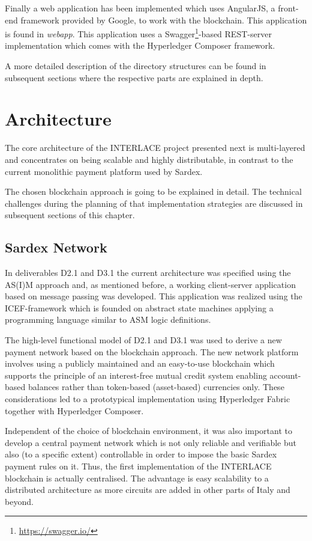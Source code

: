 Finally a web application has been implemented which uses AngularJS, a front-end framework provided by Google,  to work with the blockchain. This application is found in \textit{webapp}. This application uses a Swagger\footnote{\url{https://swagger.io/}}-based REST-server implementation which comes with the Hyperledger Composer framework.

A more detailed description of the directory structures can be found in subsequent sections where the respective parts are explained in depth.

\section{Architecture}

The core architecture of the INTERLACE project presented next is multi-layered and concentrates on being scalable and highly distributable, in contrast to the current monolithic payment platform used by Sardex.

The chosen blockchain approach is going to be explained in detail. The technical challenges during the planning of that implementation strategies are discussed in subsequent sections of this chapter.

\subsection{Sardex Network}

In deliverables D2.1 and D3.1 the current architecture was specified using the AS(I)M approach and, as mentioned before, a working client-server application based on message passing was developed. This application was realized using the ICEF-framework which is founded on abstract state machines applying a programming language similar to ASM logic definitions.

The high-level functional model of D2.1 and D3.1 was used to derive a new payment network based on the blockchain approach. The new network platform involves using a publicly maintained and an easy-to-use blockchain which supports the principle of an interest-free mutual credit system enabling account-based balances rather than token-based (asset-based) currencies only. These considerations led to a prototypical implementation using Hyperledger Fabric together with Hyperledger Composer.

Independent of the choice of blockchain environment, it was also important to develop a central payment network which is not only reliable and verifiable but also (to a specific extent) controllable in order to impose the basic Sardex payment rules on it. Thus, the first implementation of the INTERLACE blockchain is actually centralised. The advantage is easy scalability to a distributed architecture as more circuits are added in other parts of Italy and beyond.


